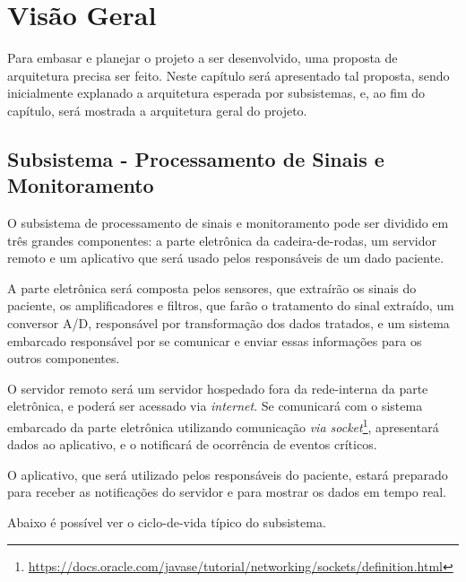 \chapter{Visão Geral}

Para embasar e planejar o projeto a ser desenvolvido, uma proposta de
arquitetura precisa ser feito. Neste capítulo será apresentado tal proposta,
sendo inicialmente explanado a arquitetura esperada por subsistemas, e, ao fim
do capítulo, será mostrada a arquitetura geral do projeto.

\section{Subsistema - Processamento de Sinais e Monitoramento}

O subsistema de processamento de sinais e monitoramento pode ser dividido em três grandes
componentes: a parte eletrônica da cadeira-de-rodas, um servidor remoto e um
aplicativo que será usado pelos responsáveis de um dado paciente.

A parte eletrônica será composta pelos sensores, que extraírão os sinais do
paciente, os amplificadores e filtros, que farão o tratamento do sinal
extraído, um conversor A/D, responsável por transformação dos dados tratados,
e um sistema embarcado responsável por se comunicar e enviar essas informações
para os outros componentes.

O servidor remoto será um servidor hospedado fora da rede-interna da parte
eletrônica, e poderá ser acessado via \textit{internet}. Se comunicará com
o sistema embarcado da parte eletrônica utilizando comunicação
\textit{via socket}\footnote{\url{https://docs.oracle.com/javase/tutorial/networking/sockets/definition.html}},
apresentará dados ao aplicativo, e o notificará de ocorrência de eventos
críticos.

O aplicativo, que será utilizado pelos responsáveis do paciente, estará
preparado para receber as notificações do servidor e para mostrar os dados em
tempo real.

Abaixo é possível ver o ciclo-de-vida típico do subsistema.

